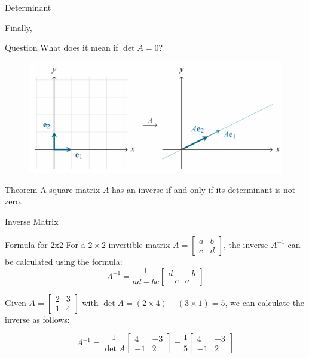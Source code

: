 \documentclass{beamer}
\begin{document}
\begin{frame}{Determinant}

Finally,

\begin{block}{Question}
    What does it mean if $\det A = 0$?
\end{block}

\pause

\begin{figure}
    \centering
    \includegraphics[width=0.85\linewidth]{0 det.png}
\end{figure}

\pause
\begin{block}{Theorem}
  A square matrix $A$ has an inverse if and only if its determinant is not zero.
\end{block}  



\end{frame}
\begin{frame}{Inverse Matrix}
    \begin{block}{Formula for 2x2}
        For a $2 \times 2$ invertible matrix $A = \begin{bmatrix} a & b \\ c & d \end{bmatrix}$, the inverse $A^{-1}$ can be calculated using the formula:
      \[
      A^{-1} = \frac{1}{ad - bc} \begin{bmatrix} d & -b \\ -c & a \end{bmatrix}
      \]
    \end{block}\pause
    \begin{example}
     Given $A = \begin{bmatrix} 2 & 3 \\ 1 & 4 \end{bmatrix}$ with $\det A  = (2 \times 4) - (3 \times 1) = 5$, we can calculate the inverse as follows:
  
  \[
  A^{-1} = \frac{1}{\det A} \begin{bmatrix} 4 & -3 \\ -1 & 2 \end{bmatrix} = \frac{1}{5} \begin{bmatrix} 4 & -3 \\ -1 & 2 \end{bmatrix}
  \]
  \end{example}
\end{frame}

\end{document}
